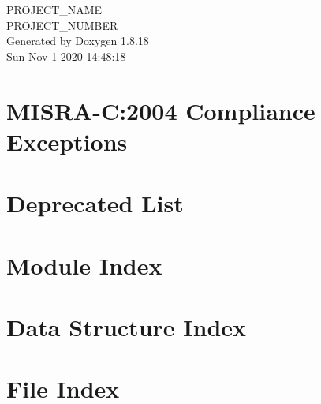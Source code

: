 \let\mypdfximage\pdfximage\def\pdfximage{\immediate\mypdfximage}\documentclass[twoside]{book}
\newcommand{\+}{\discretionary{\mbox{\scriptsize$\hookleftarrow$}}{}{}}
\newcommand{\clearemptydoublepage}{%
  \newpage{\pagestyle{empty}\cleardoublepage}%
}
\begin{document}
\hypersetup{pageanchor=false,
             bookmarksnumbered=true,
             pdfencoding=unicode
            }
\begin{titlepage}
\vspace*{7cm}
\begin{center}%
{\Large P\+R\+O\+J\+E\+C\+T\+\_\+\+N\+A\+ME \\[1ex]\large P\+R\+O\+J\+E\+C\+T\+\_\+\+N\+U\+M\+B\+ER }\\
\vspace*{1cm}
{\large Generated by Doxygen 1.8.18}\\
\vspace*{0.5cm}
{\small Sun Nov 1 2020 14:48:18}\\
\end{center}
\end{titlepage}
\clearemptydoublepage
{}
\tableofcontents
\clearemptydoublepage
{}
\hypersetup{pageanchor=true}

\chapter{M\+I\+S\+R\+A-\/C\+:2004 Compliance Exceptions}
\label{_c_m_s_i_s__m_i_s_r_a__exceptions}

\chapter{Deprecated List}
\label{deprecated}

\chapter{Module Index}

\chapter{Data Structure Index}

\chapter{File Index}

\end{document}

